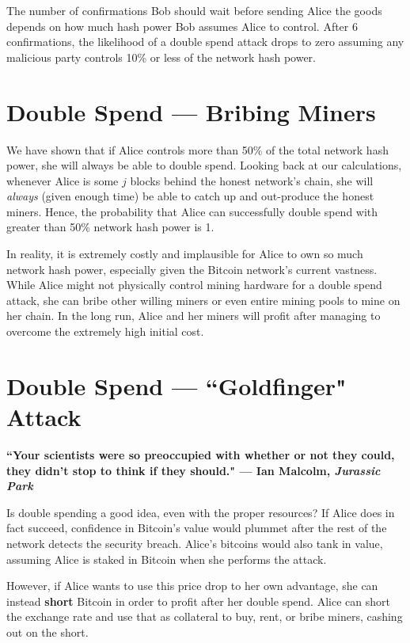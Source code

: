 \documentclass[full.tex]{subfiles}
\begin{document}
    The number of confirmations Bob should wait before sending Alice the goods depends on how much hash power Bob assumes Alice to control. After 6 confirmations, the likelihood of a double spend attack drops to zero assuming any malicious party controls 10\% or less of the network hash power. 
    
    \section*{Double Spend --- Bribing Miners}
    
    We have shown that if Alice controls more than 50\% of the total network hash power, she will always be able to double spend. Looking back at our calculations, whenever Alice is some $j$ blocks behind the honest network's chain, she will \textit{always} (given enough time) be able to catch up and out-produce the honest miners. Hence, the probability that Alice can successfully double spend with greater than 50\% network hash power is 1.
    
    In reality, it is extremely costly and implausible for Alice to own so much network hash power, especially given the Bitcoin network's current vastness. While Alice might not physically control mining hardware for a double spend attack, she can bribe other willing miners or even entire mining pools to mine on her chain. In the long run, Alice and her miners will profit after managing to overcome the extremely high initial cost.
    
    \section*{Double Spend --- ``Goldfinger" Attack}
    
    \textbf{``Your scientists were so preoccupied with whether or not they could, they didn’t stop to think if they should." --- Ian Malcolm, \textit{Jurassic Park}}
    
    Is double spending a good idea, even with the proper resources? If Alice does in fact succeed, confidence in Bitcoin's value would plummet after the rest of the network detects the security breach. Alice's bitcoins would also tank in value, assuming Alice is staked in Bitcoin when she performs the attack. 
    
    However, if Alice wants to use this price drop to her own advantage, she can instead \textbf{short} Bitcoin in order to profit after her double spend. Alice can short the exchange rate and use that as collateral to buy, rent, or bribe miners, cashing out on the short.
    
\end{document}
